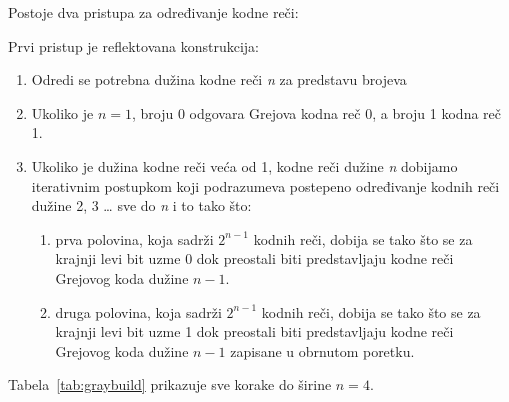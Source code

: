 \documentclass[a4paper,11pt]{article}
\numberwithin{equation}{section}
\begin{document}
Postoje dva pristupa za određivanje kodne reči:



Prvi pristup je reflektovana konstrukcija:


\begin{enumerate}[label=\arabic*.,start=1,leftmargin=*]
\item Odredi se potrebna dužina kodne reči \emph{n} za predstavu brojeva

\item Ukoliko je $n=1$, broju 0 odgovara Grejova kodna reč 0, a broju 1 kodna reč 1.

\item Ukoliko je dužina kodne reči veća od 1, kodne reči dužine \emph{n} dobijamo iterativnim postupkom koji podrazumeva postepeno određivanje kodnih reči dužine 2, 3 \ldots{} sve do \emph{n} i to tako što:

\begin{enumerate}[label=\arabic*.,start=1,leftmargin=*]
\item prva polovina, koja sadrži $2^{n-1}$ kodnih reči, dobija se tako što se za krajnji levi bit uzme 0 dok preostali biti predstavljaju kodne reči Grejovog koda dužine $n-1$.

\item druga polovina, koja sadrži $2^{n-1}$ kodnih reči, dobija se tako što se za krajnji levi bit uzme 1 dok preostali biti predstavljaju kodne reči Grejovog koda dužine $n-1$ zapisane u obrnutom poretku.

\end{enumerate}
\end{enumerate}


Tabela~\ref{tab:graybuild} prikazuje sve korake do širine $n=4$.
\end{document}
